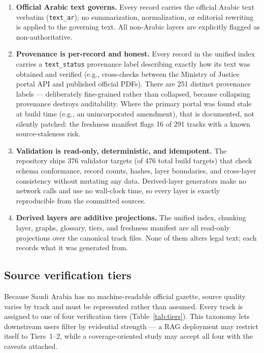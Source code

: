 \documentclass[11pt]{article}
\begin{document}
\begin{enumerate}
  \item \textbf{Official Arabic text governs.} Every record carries the
    official Arabic text verbatim (\texttt{text\_ar}); no summarization,
    normalization, or editorial rewriting is applied to the governing text.
    All non-Arabic layers are explicitly flagged as non-authoritative.
  \item \textbf{Provenance is per-record and honest.} Every record in the
    unified index carries a \texttt{text\_status} provenance label
    describing exactly how its text was obtained and verified (e.g.,
    cross-checks between the Ministry of Justice portal API and published
    official PDFs). There are 251 distinct provenance labels ---
    deliberately fine-grained rather than collapsed, because collapsing
    provenance destroys auditability. Where the primary portal was found
    stale at build time (e.g., an unincorporated amendment), that is
    documented, not silently patched: the freshness manifest flags 16 of
    291 tracks with a known source-staleness risk.
  \item \textbf{Validation is read-only, deterministic, and idempotent.}
    The repository ships 376 validator targets (of 476 total build targets)
    that check schema conformance, record counts, hashes, layer boundaries,
    and cross-layer consistency without mutating any data. Derived-layer
    generators make no network calls and use no wall-clock time, so every
    layer is exactly reproducible from the committed sources.
  \item \textbf{Derived layers are additive projections.} The unified
    index, chunking layer, graphs, glossary, tiers, and freshness manifest
    are all read-only projections over the canonical track files. None of
    them alters legal text; each records what it was generated from.
\end{enumerate}

\subsection{Source verification tiers}

Because Saudi Arabia has no machine-readable official gazette, source
quality varies by track and must be represented rather than assumed. Every
track is assigned to one of four verification tiers
(Table~\ref{tab:tiers}). This taxonomy lets downstream users filter by
evidential strength --- a RAG deployment may restrict itself to
Tiers~1--2, while a coverage-oriented study may accept all four with the
caveats attached.
\end{document}
